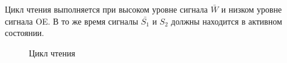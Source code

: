 Цикл чтения выполняется при высоком уровне сигнала $\bar{W}$ и низком уровне сигнала OE. В то же время сигналы
$\bar{S_1}$ и ${S_2}$ должны находится в активном состоянии. 

\begin{figure}[h]
\caption{Цикл чтения}
\label{pic:sram_read_cycle}
\end{figure}

